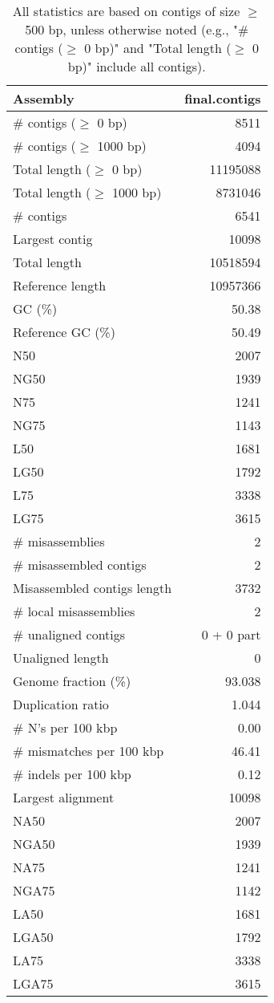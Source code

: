 \documentclass[12pt,a4paper]{article}
\begin{document}
\begin{table}[ht]
\begin{center}
\caption{All statistics are based on contigs of size $\geq$ 500 bp, unless otherwise noted (e.g., "\# contigs ($\geq$ 0 bp)" and "Total length ($\geq$ 0 bp)" include all contigs).}
\begin{tabular}{|l*{1}{|r}|}
\hline
Assembly & final.contigs \\ \hline
\# contigs ($\geq$ 0 bp) & 8511 \\ \hline
\# contigs ($\geq$ 1000 bp) & 4094 \\ \hline
Total length ($\geq$ 0 bp) & 11195088 \\ \hline
Total length ($\geq$ 1000 bp) & 8731046 \\ \hline
\# contigs & 6541 \\ \hline
Largest contig & 10098 \\ \hline
Total length & 10518594 \\ \hline
Reference length & 10957366 \\ \hline
GC (\%) & 50.38 \\ \hline
Reference GC (\%) & 50.49 \\ \hline
N50 & 2007 \\ \hline
NG50 & 1939 \\ \hline
N75 & 1241 \\ \hline
NG75 & 1143 \\ \hline
L50 & 1681 \\ \hline
LG50 & 1792 \\ \hline
L75 & 3338 \\ \hline
LG75 & 3615 \\ \hline
\# misassemblies & 2 \\ \hline
\# misassembled contigs & 2 \\ \hline
Misassembled contigs length & 3732 \\ \hline
\# local misassemblies & 2 \\ \hline
\# unaligned contigs & 0 + 0 part \\ \hline
Unaligned length & 0 \\ \hline
Genome fraction (\%) & 93.038 \\ \hline
Duplication ratio & 1.044 \\ \hline
\# N's per 100 kbp & 0.00 \\ \hline
\# mismatches per 100 kbp & 46.41 \\ \hline
\# indels per 100 kbp & 0.12 \\ \hline
Largest alignment & 10098 \\ \hline
NA50 & 2007 \\ \hline
NGA50 & 1939 \\ \hline
NA75 & 1241 \\ \hline
NGA75 & 1142 \\ \hline
LA50 & 1681 \\ \hline
LGA50 & 1792 \\ \hline
LA75 & 3338 \\ \hline
LGA75 & 3615 \\ \hline
\end{tabular}
\end{center}
\end{table}
\end{document}
